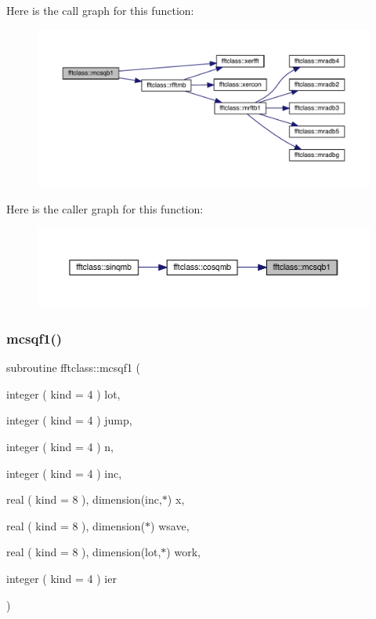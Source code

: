 Here is the call graph for this function\+:\nopagebreak
\begin{figure}[H]
\begin{center}
\leavevmode
\includegraphics[width=350pt]{namespacefftclass_a91e23ffaebaadf2b1c22e689f69996a2_cgraph}
\end{center}
\end{figure}
Here is the caller graph for this function\+:\nopagebreak
\begin{figure}[H]
\begin{center}
\leavevmode
\includegraphics[width=350pt]{namespacefftclass_a91e23ffaebaadf2b1c22e689f69996a2_icgraph}
\end{center}
\end{figure}
\mbox{\label{namespacefftclass_a05d00644e8642979b2c55b7822bbfb03}} 
\subsubsection{\texorpdfstring{mcsqf1()}{mcsqf1()}}
{\footnotesize\ttfamily subroutine fftclass\+::mcsqf1 (\begin{DoxyParamCaption}\item[{integer ( kind = 4 )}]{lot,  }\item[{integer ( kind = 4 )}]{jump,  }\item[{integer ( kind = 4 )}]{n,  }\item[{integer ( kind = 4 )}]{inc,  }\item[{real ( kind = 8 ), dimension(inc,$\ast$)}]{x,  }\item[{real ( kind = 8 ), dimension($\ast$)}]{wsave,  }\item[{real ( kind = 8 ), dimension(lot,$\ast$)}]{work,  }\item[{integer ( kind = 4 )}]{ier }\end{DoxyParamCaption})}

